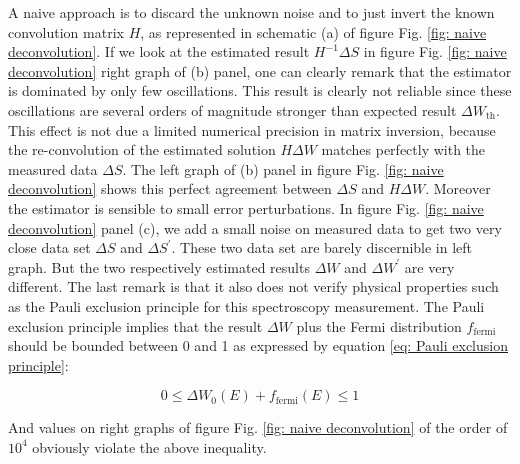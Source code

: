 A naive approach is to discard the unknown noise and to just invert the known convolution matrix $H$, as represented in schematic (a) of figure Fig. \ref{fig: naive deconvolution}. If we look at the estimated result $H^{-1}\Delta S$ in figure Fig. \ref{fig: naive deconvolution} right graph of (b) panel, one can clearly remark that the estimator is dominated by only few oscillations. This result is clearly not reliable since these oscillations are several orders of magnitude stronger than expected result $\Delta W_{\mathrm{th}}$. This effect is not due a limited numerical precision in matrix inversion, because the re-convolution of the estimated solution $H\Delta W$ matches perfectly with the measured data $\Delta S$. The left graph of (b) panel in figure Fig. \ref{fig: naive deconvolution} shows this perfect agreement between $\Delta S$ and $H\Delta W$. Moreover the estimator is sensible to small error perturbations. In figure Fig. \ref{fig: naive deconvolution} panel (c), we add a small noise on measured data to get two very close data set $\Delta S$ and $\Delta S^{\prime}$. These two data set are barely discernible in left graph. But the two respectively estimated results $\Delta W$ and $\Delta W^{\prime}$ are very different. The last remark is that it also does not verify physical properties such as the Pauli exclusion principle for this spectroscopy measurement. The Pauli exclusion principle implies that the result $\Delta W$ plus the Fermi distribution $f_{\mathrm{fermi}}$ should be bounded between 0 and 1 as expressed by equation \eqref{eq: Pauli exclusion principle}:

\begin{equation}
	0 \leq \Delta W_{0}\left(E\right)+f_{\mathrm{fermi}}\left(E\right) \leq 1 \label{eq: Pauli exclusion principle} 
\end{equation}

And values on right graphs of figure Fig. \ref{fig: naive deconvolution} of the order of $10^{4}$ obviously violate the above inequality.

